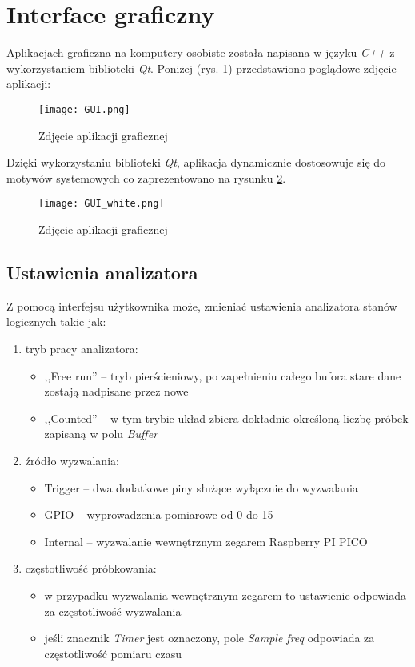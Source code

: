 \section{Interface graficzny}
    Aplikacjach graficzna na komputery osobiste została napisana w języku \textit{C++} z wykorzystaniem biblioteki \textit{Qt}.
    Poniżej (rys. \ref{fig:gui}) przedstawiono poglądowe zdjęcie aplikacji:

    \begin{figure}[!ht]
        \centering
        \texttt{[image: GUI.png]}
        \caption{Zdjęcie aplikacji graficznej}
        \label{fig:gui}
    \end{figure}

    Dzięki wykorzystaniu biblioteki \textit{Qt}, aplikacja dynamicznie dostosowuje się do motywów systemowych co zaprezentowano na rysunku \ref{fig:gui_white}.
    \begin{figure}[!ht]
        \centering
        \texttt{[image: GUI\_white.png]}
        \caption{Zdjęcie aplikacji graficznej}
        \label{fig:gui_white}
    \end{figure}


    \subsection{Ustawienia analizatora}
        Z pomocą interfejsu użytkownika może, zmieniać ustawienia analizatora stanów logicznych takie jak:
        \begin{enumerate}
            \item tryb pracy analizatora:
            \begin{itemize}
                \item ,,Free run'' -- tryb pierścieniowy, po zapełnieniu całego bufora stare dane zostają nadpisane przez nowe
                \item ,,Counted''  -- w tym trybie układ zbiera dokładnie określoną liczbę próbek zapisaną w polu \textit{Buffer}
            \end{itemize}
            \item źródło wyzwalania:
            \begin{itemize}
                \item Trigger   -- dwa dodatkowe piny służące wyłącznie do wyzwalania
                \item GPIO      -- wyprowadzenia pomiarowe od 0 do 15
                \item Internal  -- wyzwalanie wewnętrznym zegarem Raspberry PI PICO
            \end{itemize}
            \item częstotliwość próbkowania:
            \begin{itemize}
                \item w przypadku wyzwalania wewnętrznym zegarem to ustawienie odpowiada za częstotliwość wyzwalania
                \item jeśli znacznik \textit{Timer} jest oznaczony, pole \textit{Sample freq} odpowiada za częstotliwość pomiaru czasu
            \end{itemize}
        \end{enumerate}


